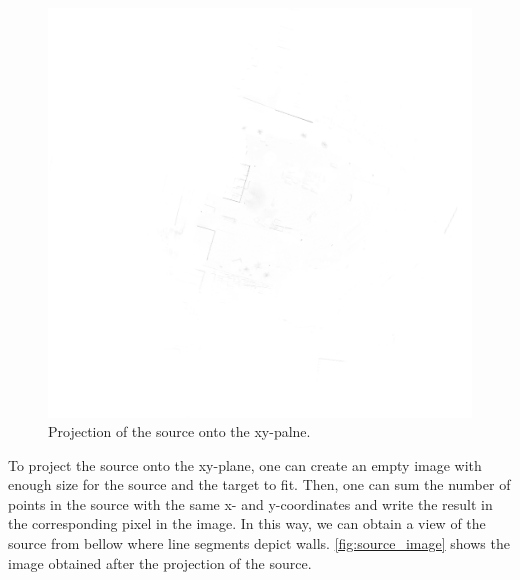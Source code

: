             \begin{figure}[H]
                \includegraphics[width=\textwidth]{images/solution_images/source_image_inverted.png}
                \caption{Projection of the source onto the xy-palne.}
                \label{fig:source_image}
            \end{figure}

            To project the source onto the xy-plane, one can create an empty image with enough size for the source and the target to fit.
            Then, one can sum the number of points in the source with the same x- and y-coordinates and write the result in the corresponding pixel in the image.
            In this way, we can obtain a view of the source from bellow where line segments depict walls.
            \autoref{fig:source_image} shows the image obtained after the projection of the source.
            

